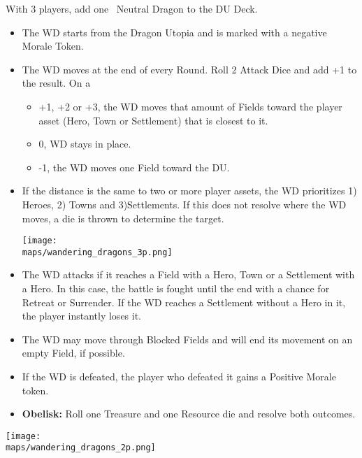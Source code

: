 \begin{multicols*}{2}
With 3 players, add one \golden\ Neutral Dragon to the DU Deck.

\begin{itemize}
  \item The WD starts from the Dragon Utopia and is marked with a negative Morale Token.
  \item The WD moves at the end of every Round. Roll 2 Attack Dice and add +1 to the result. On a
  \begin{itemize}
    \item +1, +2 or +3, the WD moves that amount of Fields toward the player asset (Hero, Town or Settlement) that is closest to it.
    \item 0, WD stays in place.
    \item -1, the WD moves one Field toward the DU.
  \end {itemize}
  \item If the distance is the same to two or more player assets, the WD prioritizes 1) Heroes, 2) Towns and 3)Settlements. If this does not resolve where the WD moves, a die is thrown to determine the target.

\begin{center}
  \vspace*{\fill}
  \texttt{[image: \\maps/wandering\_dragons\_3p.png]}
  \vspace*{\fill}
\end{center}

\columnbreak

  \item The WD attacks if it reaches a Field with a Hero, Town or a Settlement with a Hero. In this case, the battle is fought until the end with a chance for Retreat or Surrender. If the WD reaches a Settlement without a Hero in it, the player instantly loses it.
  \item The WD may move through Blocked Fields and will end its movement on an empty Field, if possible.
  \item If the WD is defeated, the player who defeated it gains a Positive Morale token.
  \item \textbf{Obelisk:} Roll one Treasure and one Resource die and resolve both outcomes.
\end{itemize}

\vspace*{\fill}

\begin{center}
  \texttt{[image: \\maps/wandering\_dragons\_2p.png]}
\end{center}

\end{multicols*}
